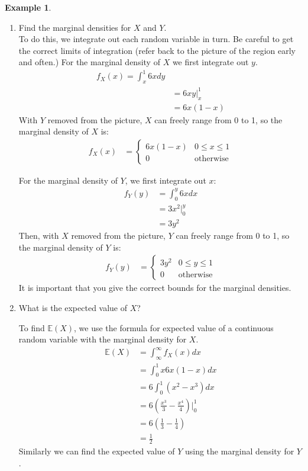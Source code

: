 \documentclass[12pt]{article}
\theoremstyle{definition}
\newtheorem*{example}{Example}
\theoremstyle{remark}
\def\E{{\mathbb E}}
\begin{document}
\begin{example}
\begin{enumerate}
\item Find the marginal densities for $X$ and $Y$.\\

To do this, we integrate out each random variable in turn. Be careful to get the correct limits of integration (refer back to the picture of the region early and often.) For the marginal density of $X$ we first integrate out $y$.
\begin{align*}
f_X(x) = \int_x^1 6 x dy \\
&= 6 x y\Bigr|_x^1 \\
&= 6 x(1 - x)
\end{align*}
With $Y$ removed from the picture, $X$ can freely range from 0 to 1, so the marginal density of $X$ is:
\begin{align*}
f_X(x) &= \begin{cases}
  6 x(1 - x) & 0 \leq x \leq 1 \\
  0 & \textrm{otherwise}
   \end{cases}
\end{align*}

For the marginal density of $Y$, we first integrate out $x$:
\begin{align*}
f_Y(y) &= \int_0^y 6 x dx \\
&= 3 x^2\Bigr|_0^y \\
&= 3 y^2
\end{align*}
Then, with $X$ removed from the picture, $Y$ can freely range from 0 to 1, so the marginal density of $Y$ is:
\begin{align*}
f_Y(y) &= \begin{cases}
  3 y^2 & 0 \leq y \leq 1 \\
  0 & \textrm{otherwise}
   \end{cases}
\end{align*}
It is important that you give the correct bounds for the marginal densities.

\item What is the expected value of $X$?

To find $\E(X)$, we use the formula for expected value of a continuous random variable with the marginal density for $X$.
\begin{align*}
\E(X) &= \int_{\infty}^\infty f_X(x) dx \\
&= \int_0^1 x 6 x(1 - x) dx \\
&= 6 \int_0^1 (x^2 - x^3) dx \\
&= 6 \left( \frac{x^3}{3} - \frac{x^4}{4} \right)\Bigr|_0^1 \\
&= 6\left(\frac{1}{3} - \frac{1}{4} \right)\\
&= \frac{1}{2}
\end{align*}
Similarly we can find the expected value of $Y$ using the marginal density for $Y$.


\end{enumerate}
\end{example}
\end{document}
